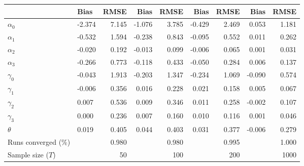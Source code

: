
\begin{tabular}[t]{llrrrrrrr}
\toprule
  & Bias & RMSE & Bias & RMSE & Bias & RMSE & Bias & RMSE\\
\midrule
$\alpha_{0}$ & -2.374 & 7.145 & -1.076 & 3.785 & -0.429 & 2.469 & 0.053 & 1.181\\
$\alpha_{1}$ & -0.532 & 1.594 & -0.238 & 0.843 & -0.095 & 0.552 & 0.011 & 0.262\\
$\alpha_{2}$ & -0.020 & 0.192 & -0.013 & 0.099 & -0.006 & 0.065 & 0.001 & 0.031\\
$\alpha_{3}$ & -0.266 & 0.773 & -0.118 & 0.433 & -0.050 & 0.284 & 0.006 & 0.137\\
$\gamma_{0}$ & -0.043 & 1.913 & -0.203 & 1.347 & -0.234 & 1.069 & -0.090 & 0.574\\
$\gamma_{1}$ & -0.006 & 0.356 & 0.016 & 0.228 & 0.021 & 0.158 & 0.005 & 0.067\\
$\gamma_{2}$ & 0.007 & 0.536 & 0.009 & 0.346 & 0.011 & 0.258 & -0.002 & 0.107\\
$\gamma_{3}$ & 0.000 & 0.236 & 0.007 & 0.160 & 0.010 & 0.116 & 0.001 & 0.046\\
$\theta$ & 0.019 & 0.405 & 0.044 & 0.403 & 0.031 & 0.377 & -0.006 & 0.279\\
Runs converged (\%) &  & 0.980 &  & 0.980 &  & 0.995 &  & 1.000\\
Sample size ($T$) &  & 50 &  & 100 &  & 200 &  & 1000\\
\bottomrule
\end{tabular}
